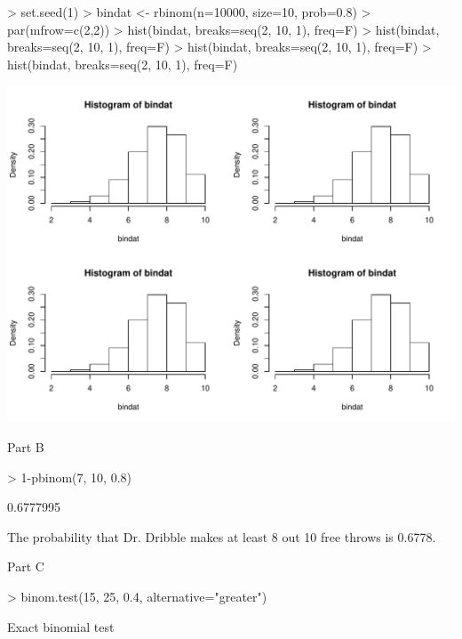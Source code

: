 \documentclass{article}
\begin{document}
\begin{flushleft}
\begin{Schunk}
\begin{Sinput}
> set.seed(1)
> bindat <- rbinom(n=10000, size=10, prob=0.8)
> par(mfrow=c(2,2))
> hist(bindat, breaks=seq(2, 10, 1), freq=F)
> hist(bindat, breaks=seq(2, 10, 1), freq=F)
> hist(bindat, breaks=seq(2, 10, 1), freq=F)
> hist(bindat, breaks=seq(2, 10, 1), freq=F)
\end{Sinput}
\end{Schunk}
\includegraphics{STAT673HW0-1a2}


Part B\\
\begin{Schunk}
\begin{Sinput}
> 1-pbinom(7, 10, 0.8)
\end{Sinput}
\begin{Soutput}
[1] 0.6777995
\end{Soutput}
\end{Schunk}

The probability that Dr. Dribble makes at least 8 out 10 free throws is 0.6778. 

\pagebreak

Part C\\
\begin{Schunk}
\begin{Sinput}
> binom.test(15, 25, 0.4, alternative="greater")
\end{Sinput}
\begin{Soutput}
	Exact binomial test


\end{Soutput}
\end{Schunk}
\end{flushleft}
\end{document}
